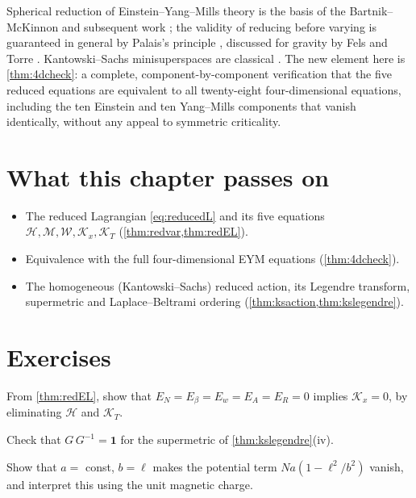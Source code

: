 \begin{litbox}
Spherical reduction of Einstein--Yang--Mills theory is the basis of the Bartnik--McKinnon and subsequent work \cite{BartnikMcKinnon1988,VolkovGaltsov1999}; the validity of reducing before varying is guaranteed in general by Palais's principle \cite{Palais1979}, discussed for gravity by Fels and Torre \cite{FelsTorre2002}. Kantowski--Sachs minisuperspaces are classical \cite{KantowskiSachs1966}. The new element here is \cref{thm:4dcheck}: a complete, component-by-component verification that the five reduced equations are equivalent to all twenty-eight four-dimensional equations, including the ten Einstein and ten Yang--Mills components that vanish identically, without any appeal to symmetric criticality.
\end{litbox}

\section*{What this chapter passes on}
\begin{itemize}[nosep]
\item The reduced Lagrangian \eqref{eq:reducedL} and its five equations $\mathcal H,\mathcal M,\mathcal W,\mathcal K_x,\mathcal K_T$ (\cref{thm:redvar,thm:redEL}).
\item Equivalence with the full four-dimensional EYM equations (\cref{thm:4dcheck}).
\item The homogeneous (Kantowski--Sachs) reduced action, its Legendre transform, supermetric and Laplace--Beltrami ordering (\cref{thm:ksaction,thm:kslegendre}).
\end{itemize}

\section*{Exercises}
\begin{exercise}
From \cref{thm:redEL}, show that $E_N=E_\beta=E_w=E_A=E_R=0$ implies $\mathcal K_x=0$, by eliminating $\mathcal H$ and $\mathcal K_T$.
\end{exercise}
\begin{exercise}
Check that $G\,G^{-1}=\mathbf 1$ for the supermetric of \cref{thm:kslegendre}(iv).
\end{exercise}
\begin{exercise}
Show that $a=$ const, $b=\ell$ makes the potential term $Na(1-\ell^2/b^2)$ vanish, and interpret this using the unit magnetic charge.
\end{exercise}

